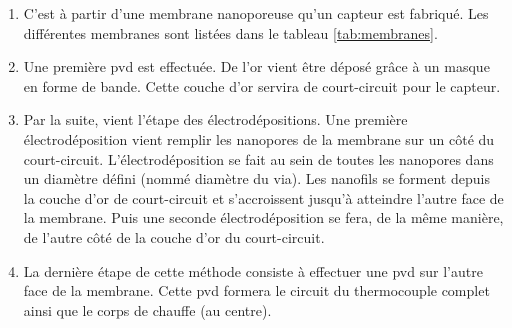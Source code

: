 \begin{itemize}
          \noindent \begin{enumerate}[label=(\alph*), wide, labelwidth=!, labelindent = 0pt]
              \item C'est à partir d'une membrane nanoporeuse qu'un capteur est fabriqué. Les différentes membranes sont listées dans le tableau
                    \ref{tab:membranes}. \\
              \item Une première \gls{pvd} est effectuée. De l'or vient être déposé grâce à un masque en forme de bande.
                    Cette couche d'or servira de court-circuit pour le capteur. \\
              \item Par la suite, vient l'étape des électrodépositions. Une première électrodéposition vient remplir les nanopores de la membrane
                    sur un côté du court-circuit. L'électrodéposition se fait au sein de toutes les nanopores dans un diamètre défini (nommé diamètre du via). 
                    Les nanofils se forment depuis la couche d'or de court-circuit et s'accroissent jusqu'à atteindre l'autre face de la membrane. 
                    Puis une seconde électrodéposition se fera, de la même manière, de l'autre côté de la couche d'or du court-circuit. \\
              \item La dernière étape de cette méthode consiste à effectuer une \gls{pvd} sur l'autre face de la membrane. Cette \gls{pvd} formera
                    le circuit du thermocouple complet ainsi que le corps de chauffe (au centre). 
          \end{enumerate}
          

\end{itemize}
